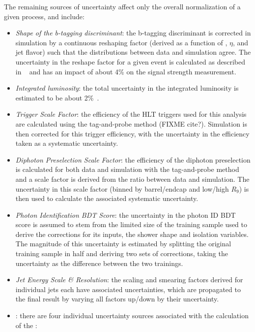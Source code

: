 The remaining sources of uncertainty affect only the overall normalization of a given process, and include:
\begin{itemize}
    \item \emph{Shape of the b-tagging discriminant}: the b-tagging discriminant is corrected in simulation by a continuous reshaping factor (derived as a function of \pT, $\eta$, and jet flavor) such that the distributions between data and simulation agree. The uncertainty in the reshape factor for a given event is calculated as described in ~\cite{Sirunyan_2018_deepcsv} and has an impact of about 4\% on the \ttH signal strength measurement.
    \item \emph{Integrated luminosity}: the total uncertainty in the integrated luminosity is estimated to be about 2\%~\cite{CMS-PAS-LUM-17-001,CMS-PAS-LUM-17-004,CMS-PAS-LUM-18-002}.
    \item \emph{Trigger Scale Factor}: the efficiency of the HLT triggers used for this analysis are calculated using the tag-and-probe method (FIXME cite?). Simulation is then corrected for this trigger efficiency, with the uncertainty in the efficiency taken as a systematic uncertainty.
    \item \emph{Diphoton Preselection Scale Factor}: the efficiency of the diphoton preselection is calculated for both data and simulation with the tag-and-probe method and a scale factor is derived from the ratio between data and simulation. The uncertainty in this scale factor (binned by barrel/endcap and low/high $R_9$) is then used to calculate the associated systematic uncertainty. 
    \item \emph{Photon Identification BDT Score}: the uncertainty in the photon ID BDT score is assumed to stem from the limited size of the training sample used to derive the corrections for its inputs, the shower shape and isolation variables. The magnitude of this uncertainty is estimated by splitting the original training sample in half and deriving two sets of corrections, taking the uncertainty as the difference between the two trainings.
    \item \emph{Jet Energy Scale \& Resolution}: the scaling and smearing factors derived for individual jets each have associated uncertainties, which are propagated to the final result by varying all factors up/down by their uncertainty.
    \item \emph{\met }: there are four individual uncertainty sources associated with the calculation of the \met:
    \begin{itemize}

\end{itemize}
\end{itemize}
